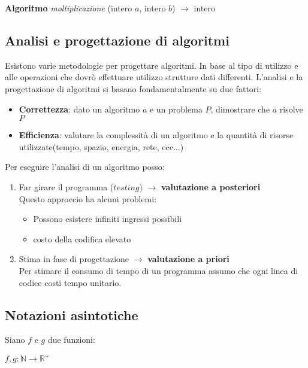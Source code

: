 \begin{algorithm}
    \caption{$moltiplicazione$}
    {\textbf{Algoritmo}} {\emph{moltiplicazione}} (intero $a$, intero $b$) $\rightarrow$ intero\\
\end{algorithm}

\subsection{Analisi e progettazione di algoritmi}
Esistono varie metodologie per progettare algoritmi. In base al tipo di utilizzo e
alle operazioni che dovrò effettuare utilizzo strutture dati differenti.
L'analisi e la progettazione di algoritmi si basano fondamentalmente su due fattori:
\begin{itemize}
    \item {\textbf{Correttezza}}: dato un algoritmo $a$ e un problema $P$, dimostrare che $a$ risolve $P$
    \item {\textbf{Efficienza}}: valutare la complessità di un algoritmo e la quantità di risorse
    utilizzate(tempo, spazio, energia, rete, ecc...)
\end{itemize}

\noindent Per eseguire l'analisi di un algoritmo posso:
\begin{enumerate}
    \item Far girare il programma ($testing$) $\rightarrow$ {\textbf{valutazione a posteriori}}\\
    Questo approccio ha alcuni problemi:
    \begin{itemize}
        \item Possono esistere infiniti ingressi possibili
        \item costo della codifica elevato
    \end{itemize}
    \item Stima in fase di progettazione $\rightarrow$ {\textbf{valutazione a priori}}\\
    Per stimare il consumo di tempo di un programma assumo che ogni linea di codice
    costi tempo unitario.
\end{enumerate}

\subsection{Notazioni asintotiche}
Siano $f$ e $g$ due funzioni:
\begin{center}
    $f,g: \mathbb{N} \to \mathbb{R^+}$
\end{center}

